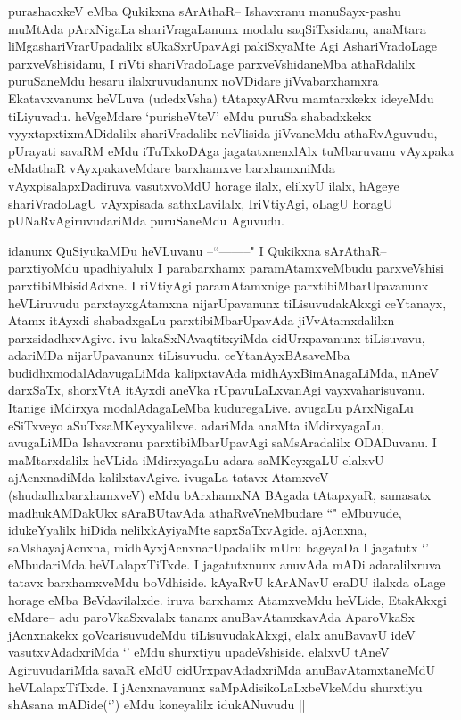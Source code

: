 \begin{artha}
purashacxkeV eMba Qukikxna sArAthaR-- Ishavxranu manuSayx-pashu muMtAda pArxNigaLa shariVragaLanunx modalu saqSiTxsidanu, anaMtara liMgashariVrarUpadalilx sUkaSxrUpavAgi pakiSxyaMte Agi AshariVradoLage parxveVshisidanu, I riVti shariVradoLage parxveVshidaneMba athaRdalilx puruSaneMdu hesaru ilalxruvudanunx noVDidare jiVvabarxhamxra Ekatavxvanunx heVLuva (udedxVsha) tAtapxyARvu mamtarxkekx ideyeMdu tiLiyuvadu. heVgeMdare `purisheVteV' eMdu puruSa shabadxkekx vyyxtapxtixmADidalilx shariVradalilx neVlisida jiVvaneMdu athaRvAguvudu, pUrayati savaRM eMdu iTuTxkoDAga jagatatxnenxlAlx tuMbaruvanu vAyxpaka eMdathaR vAyxpakaveMdare barxhamxve barxhamxniMda vAyxpisalapxDadiruva vasutxvoMdU horage ilalx, elilxyU ilalx, hAgeye shariVradoLagU vAyxpisada sathxLavilalx, IriVtiyAgi, oLagU horagU pUNaRvAgiruvudariMda puruSaneMdu Aguvudu.

idanunx  QuSiyukaMDu heVLuvanu --``\stext--------" I Qukikxna sArAthaR-- parxtiyoMdu upadhiyalulx I parabarxhamx paramAtamxveMbudu parxveVshisi parxtibiMbisidAdxne. I riVtiyAgi paramAtamxnige parxtibiMbarUpavanunx heVLiruvudu parxtayxgAtamxna nijarUpavanunx tiLisuvudakAkxgi ceYtanayx, Atamx itAyxdi shabadxgaLu parxtibiMbarUpavAda jiVvAtamxdalilxn parxsidadhxvAgive. ivu lakaSxNAvaqtitxyiMda cidUrxpavanunx tiLisuvavu, adariMDa nijarUpavanunx tiLisuvudu. ceYtanAyxBAsaveMba budidhxmodalAdavugaLiMda kalipxtavAda midhAyxBimAnagaLiMda, nAneV darxSaTx, shorxVtA itAyxdi aneVka rUpavuLaLxvanAgi vayxvaharisuvanu. Itanige iMdirxya modalAdagaLeMba kuduregaLive. avugaLu pArxNigaLu eSiTxveyo aSuTxsaMKeyxyalilxve. adariMda anaMta iMdirxyagaLu, avugaLiMDa Ishavxranu parxtibiMbarUpavAgi saMsAradalilx ODADuvanu. I maMtarxdalilx heVLida iMdirxyagaLu adara saMKeyxgaLU elalxvU ajAcnxnadiMda kalilxtavAgive. ivugaLa tatavx AtamxveV (shudadhxbarxhamxveV) eMdu bArxhamxNA BAgada tAtapxyaR, samasatx madhukAMDakUkx sAraBUtavAda athaRveVneMbudare ``\stext" eMbuvude, idukeYyalilx hiDida nelilxkAyiyaMte sapxSaTxvAgide. ajAcnxna, saMshayajAcnxna, midhAyxjAcnxnarUpadalilx mUru bageyaDa I jagatutx `\stext' eMbudariMda heVLalapxTiTxde. I jagatutxnunx anuvAda mADi adaralilxruva tatavx barxhamxveMdu boVdhiside. kAyaRvU kArANavU eraDU ilalxda oLage horage eMba BeVdavilalxde. iruva barxhamx AtamxveMdu heVLide, EtakAkxgi eMdare-- adu paroVkaSxvalalx tananx anuBavAtamxkavAda AparoVkaSx jAcnxnakekx goVcarisuvudeMdu tiLisuvudakAkxgi, elalx anuBavavU ideV vasutxvAdadxriMda `\stext' eMdu shurxtiyu upadeVshiside. elalxvU tAneV AgiruvudariMda savaR eMdU cidUrxpavAdadxriMda anuBavAtamxtaneMdU heVLalapxTiTxde. I jAcnxnavanunx saMpAdisikoLaLxbeVkeMdu shurxtiyu shAsana mADide(`\stext') eMdu koneyalilx idukANuvudu ||
\end{artha}

